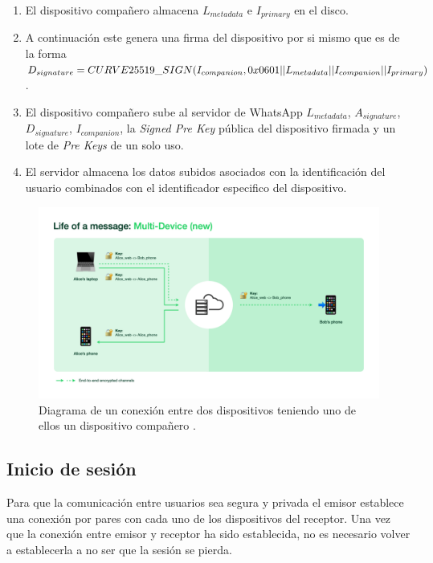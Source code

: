 \begin{description}
\begin{enumerate}
		\item El dispositivo compañero almacena $L_{metadata}$ e $I_{primary}$ en el disco.
		\item A continuación este genera una firma del dispositivo por si mismo que es de la forma 
		$	D_{signature}=CURVE25519\_SIGN(I_{companion}\\, 0x0601 || L_{metadata} || I_{companion} || I_{primary})$.
		\item El dispositivo compañero sube al servidor de WhatsApp $L_{metadata}$, $A_{signature}$, $D_{signature}$, $I_{companion}$, la \emph{Signed Pre Key} pública del dispositivo firmada y un lote de \emph{Pre Keys} de un solo uso.
		\item El servidor almacena los datos subidos asociados con la identificación del usuario combinados con el identificador especifico del dispositivo.
	\end{enumerate}
\end{description}


\begin{figure}[htb]
	\centering
	\includegraphics[scale=0.25]{imagenes/what1.png} 
	\caption{Diagrama de un conexión entre dos dispositivos teniendo uno de ellos un dispositivo compañero \cite{what1}.}
	\label{what1}
\end{figure}

\subsection{Inicio de sesión}
Para que la comunicación entre usuarios sea segura y privada el emisor establece una conexión por pares con cada uno de los dispositivos del receptor. Una vez que la conexión entre emisor y receptor ha sido establecida, no es necesario volver a establecerla a no ser que la sesión se pierda.

